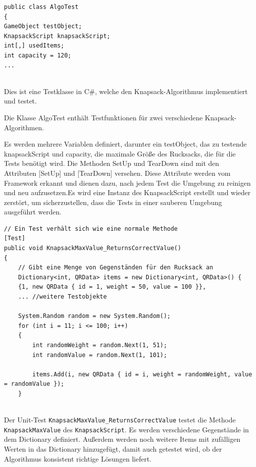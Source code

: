 \begin{lstlisting}[style=csharp, caption={Unit Test Klasse}, label=code:UnitTest]
public class AlgoTest
{
GameObject testObject;
KnapsackScript knapsackScript;
int[,] usedItems;
int capacity = 120;
...
\end{lstlisting}\\

Dies ist eine Testklasse in C#, welche den Knapsack-Algorithmus implementiert und testet.

Die Klasse AlgoTest enthält Testfunktionen für zwei verschiedene Knapsack-Algorithmen.

Es werden mehrere Variablen definiert, darunter ein testObject, das zu testende knapsackScript und capacity, die maximale
Größe des Rucksacks, die für die Tests benötigt wird. Die Methoden SetUp und TearDown sind mit den Attributen [SetUp] und
[TearDown] versehen. Diese Attribute werden vom Framework erkannt und dienen dazu, nach jedem Test die Umgebung zu reinigen
und neu aufzusetzen.Es wird eine Instanz des KnapsackScript erstellt und wieder zerstört, um sicherzustellen, dass die
Tests in einer sauberen Umgebung ausgeführt werden.
\newpage

\begin{lstlisting}[style=csharp, caption={Unit Test Methode}, label=code:Test Methode]
// Ein Test verhält sich wie eine normale Methode
[Test]
public void KnapsackMaxValue_ReturnsCorrectValue()
{
    // Gibt eine Menge von Gegenständen für den Rucksack an
    Dictionary<int, QRData> items = new Dictionary<int, QRData>() {
    {1, new QRData { id = 1, weight = 50, value = 100 }},
    ... //weitere Testobjekte

    System.Random random = new System.Random();
    for (int i = 11; i <= 100; i++)
    {
        int randomWeight = random.Next(1, 51);
        int randomValue = random.Next(1, 101);

        items.Add(i, new QRData { id = i, weight = randomWeight, value = randomValue });
    }
\end{lstlisting}\\

Der Unit-Test \texttt{KnapsackMaxValue\_ReturnsCorrectValue} testet die Methode \texttt{KnapsackMaxValue} des \texttt{KnapsackScript}.
Es werden verschiedene Gegenstände in dem Dictionary definiert. Außerdem werden noch weitere Items mit zufälligen Werten
in das Dictionary hinzugefügt, damit auch getestet wird, ob der Algorithmus konsistent richtige Lösungen liefert.

